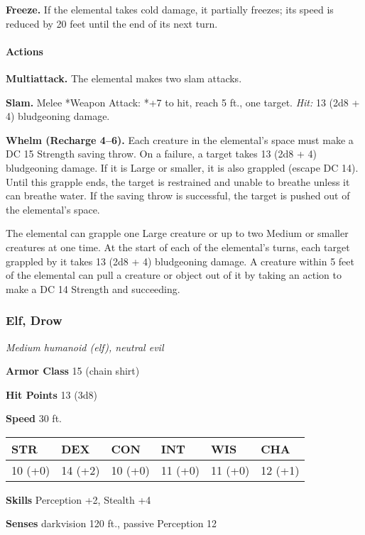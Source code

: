 \documentclass[
]{article}
\begin{document}
\textbf{Freeze.} If the elemental takes cold damage, it partially
freezes; its speed is reduced by 20 feet until the end of its next turn.

\hypertarget{actions-3}{%
\paragraph{Actions}\label{actions-3}}

\textbf{Multiattack.} The elemental makes two slam attacks.

\textbf{Slam.} Melee *Weapon Attack: *+7 to hit, reach 5 ft., one
target. \emph{Hit:} 13 (2d8 + 4) bludgeoning damage.

\textbf{Whelm (Recharge 4--6).} Each creature in the elemental's space
must make a DC 15 Strength saving throw. On a failure, a target takes 13
(2d8 + 4) bludgeoning damage. If it is Large or smaller, it is also
grappled (escape DC 14). Until this grapple ends, the target is
restrained and unable to breathe unless it can breathe water. If the
saving throw is successful, the target is pushed out of the elemental's
space.

The elemental can grapple one Large creature or up to two Medium or
smaller creatures at one time. At the start of each of the elemental's
turns, each target grappled by it takes 13 (2d8 + 4) bludgeoning damage.
A creature within 5 feet of the elemental can pull a creature or object
out of it by taking an action to make a DC 14 Strength and succeeding.

\hypertarget{elf-drow}{%
\subsubsection{Elf, Drow}\label{elf-drow}}

\emph{Medium humanoid (elf), neutral evil}

\textbf{Armor Class} 15 (chain shirt)

\textbf{Hit Points} 13 (3d8)

\textbf{Speed} 30 ft.

\begin{longtable}[]{@{}llllll@{}}
\toprule
STR & DEX & CON & INT & WIS & CHA\tabularnewline
\midrule
\endhead
10 (+0) & 14 (+2) & 10 (+0) & 11 (+0) & 11 (+0) & 12 (+1)\tabularnewline
\bottomrule
\end{longtable}

\textbf{Skills} Perception +2, Stealth +4

\textbf{Senses} darkvision 120 ft., passive Perception 12
\end{document}
